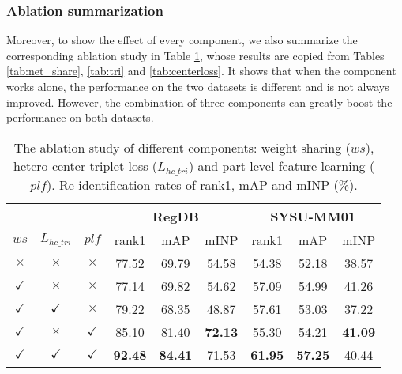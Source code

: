 \documentclass[journal]{IEEEtran}
\begin{document}
\subsubsection{Ablation summarization}
\label{sssec:ablasum}
Moreover, to show the effect of every component, we also summarize the corresponding ablation study in Table \ref{tab:ablation}, whose results are copied from Tables \ref{tab:net_share}, \ref{tab:tri} and \ref{tab:centerloss}. It shows that when the component works alone, the performance on the two datasets is different and is not always improved. However, the combination of three components can greatly boost the performance on both datasets.

\begin{table}
\scriptsize
\caption{The ablation study of different components: weight sharing ($ws$), hetero-center triplet loss ($L_{hc\_tri}$) and part-level feature learning ($plf$). Re-identification rates of rank1, mAP and mINP (\%).}
\label{tab:ablation}
  \centering
\begin{tabular}{c|c|c|c|c|c|c|c|c}
   \toprule[2pt]
    \multicolumn{3}{c|}{} & \multicolumn{3}{c|}{RegDB} & \multicolumn{3}{c}{SYSU-MM01}\\ \hline
    $ws$ & $L_{hc\_tri}$ & $plf$ & rank1 & mAP & mINP & rank1 & mAP & mINP \\ \toprule[1pt]
    $\times$ & $\times$ & $\times$ & 77.52 & 69.79 & 54.58 & 54.38 & 52.18 & 38.57 \\
    $\checkmark$ & $\times$ & $\times$ & 77.14 & 69.82 & 54.62 & 57.09 & 54.99 & 41.26 \\
    $\checkmark$ & $\checkmark$ & $\times$ & 79.22 & 68.35 & 48.87 & 57.61 & 53.03 & 37.22 \\
    $\checkmark$ & $\times$ & $\checkmark$ & 85.10 & 81.40 & \textbf{72.13} & 55.30 & 54.21 & \textbf{41.09} \\
    $\checkmark$ & $\checkmark$ & $\checkmark$ & \textbf{92.48} & \textbf{84.41} & 71.53 & \textbf{61.95} & \textbf{57.25} & 40.44 \\
     \toprule[2pt]
  \end{tabular}
\end{table}
\end{document}
